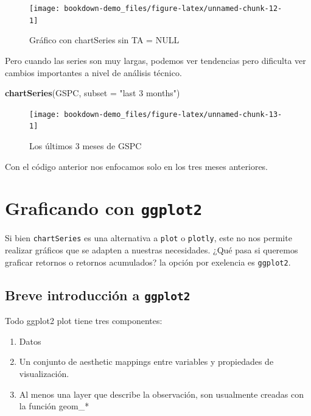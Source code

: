 \documentclass[12pt,]{book}
\newenvironment{Shaded}{\begin{snugshade}}{\end{snugshade}}
\newcommand{\KeywordTok}[1]{\textcolor[rgb]{0.13,0.29,0.53}{\textbf{#1}}}
\newcommand{\DataTypeTok}[1]{\textcolor[rgb]{0.13,0.29,0.53}{#1}}
\newcommand{\StringTok}[1]{\textcolor[rgb]{0.31,0.60,0.02}{#1}}
\newcommand{\NormalTok}[1]{#1}
\providecommand{\tightlist}{%
  \setlength{\itemsep}{0pt}\setlength{\parskip}{0pt}}
\begin{document}
\begin{figure}

{\centering \texttt{[image: bookdown-demo\_files/figure-latex/unnamed-chunk-12-1]} 

}

\caption{Gráfico con chartSeries sin TA = NULL}\label{fig:unnamed-chunk-12}
\end{figure}

Pero cuando las series son muy largas, podemos ver tendencias pero
dificulta ver cambios importantes a nivel de análisis técnico.

\begin{Shaded}
\begin{Highlighting}[]
\KeywordTok{chartSeries}\NormalTok{(GSPC, }\DataTypeTok{subset =} \StringTok{"last 3 months"}\NormalTok{)}
\end{Highlighting}
\end{Shaded}

\begin{figure}

{\centering \texttt{[image: bookdown-demo\_files/figure-latex/unnamed-chunk-13-1]} 

}

\caption{Los últimos 3 meses de GSPC}\label{fig:unnamed-chunk-13}
\end{figure}

Con el código anterior nos enfocamos solo en los tres meses anteriores.

\section{\texorpdfstring{Graficando con
\texttt{ggplot2}}{Graficando con ggplot2}}\label{graficando-con-ggplot2}

Si bien \texttt{chartSeries} es una alternativa a \texttt{plot} o
\texttt{plotly}, este no nos permite realizar gráficos que se adapten a
nuestras necesidades. ¿Qué pasa si queremos graficar retornos o retornos
acumulados? la opción por exelencia es \texttt{ggplot2}.

\subsection{\texorpdfstring{Breve introducción a
\texttt{ggplot2}}{Breve introducción a ggplot2}}\label{breve-introduccion-a-ggplot2}

Todo ggplot2 plot tiene tres componentes:

\begin{enumerate}
\def\labelenumi{\arabic{enumi}.}
\tightlist
\item
  Datos
\item
  Un conjunto de aesthetic mappings entre variables y propiedades de
  visualización.
\item
  Al menos una layer que describe la observación, son usualmente creadas
  con la función geom\_*
\end{enumerate}
\end{document}
